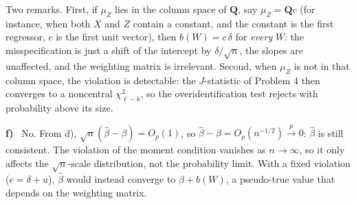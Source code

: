 \documentclass[11pt]{article}
\newcommand{\symbf}[1]{\boldsymbol{#1}}
\newcommand{\itm}[1]{\par\textbf{#1)}\ }
\begin{document}
Two remarks. First, if $\mu_Z$ lies in the column space of $\symbf Q$, say $\mu_Z=\symbf Qc$ (for instance, when both $X$ and $Z$ contain a constant, and the constant is the first regressor, $c$ is the first unit vector), then $b(W)=c\,\delta$ for \emph{every} $W$: the misspecification is just a shift of the intercept by $\delta/\sqrt n$, the slopes are unaffected, and the weighting matrix is irrelevant. Second, when $\mu_Z$ is not in that column space, the violation is detectable: the $J$-statistic of Problem 4 then converges to a noncentral $\chi^2_{\ell-k}$, so the overidentification test rejects with probability above its size.

\itm{f}
No. From d), $\sqrt n(\hat\beta-\beta)=O_p(1)$, so $\hat\beta-\beta=O_p(n^{-1/2})\xrightarrow{p}0$: $\hat\beta$ is still consistent. The violation of the moment condition vanishes as $n\to\infty$, so it only affects the $\sqrt n$-scale distribution, not the probability limit. With a fixed violation ($e=\delta+u$), $\hat\beta$ would instead converge to $\beta+b(W)$, a pseudo-true value that depends on the weighting matrix.
\end{document}
